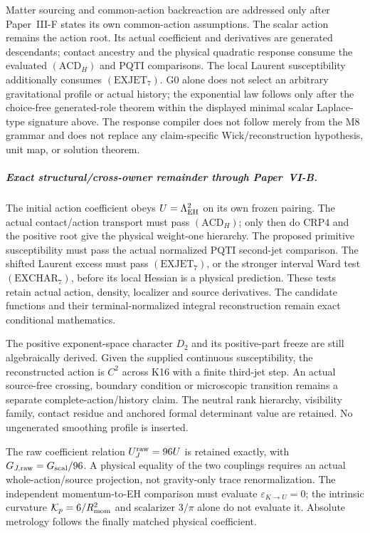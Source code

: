 \documentclass[12pt,a4paper]{article}
\begin{document}
Matter sourcing and common-action backreaction are addressed only after
Paper~III-F states its own common-action assumptions.
The scalar action remains the action root. Its actual coefficient and
derivatives are generated descendants; contact ancestry and the physical
quadratic response consume the evaluated $(\mathrm{ACD}_H)$ and PQTI
comparisons. The local Laurent susceptibility additionally consumes
$(\mathrm{EXJET}_7)$.  G0 alone
does not select an arbitrary gravitational profile or actual history; the
exponential law follows only after the
choice-free generated-role theorem within the displayed minimal scalar
Laplace-type signature above.  The response compiler does not follow merely
from the M8 grammar and does not replace any claim-specific
Wick/reconstruction hypothesis, unit map, or solution theorem.


\subparagraph{Exact structural/cross-owner remainder through Paper~VI-B.}
The initial action coefficient obeys $U=\Lambda_{\rm EH}^2$ on its own
frozen pairing. The actual contact/action transport must pass
$(\mathrm{ACD}_H)$; only then do CRP4 and the positive root give the
physical weight-one hierarchy. The proposed primitive susceptibility must
pass the actual normalized PQTI second-jet comparison. The shifted Laurent
excess must pass $(\mathrm{EXJET}_7)$, or the stronger interval Ward test
$(\mathrm{EXCHAR}_7)$, before its local Hessian is a physical prediction.
These tests retain actual action, density, localizer and source derivatives.
The candidate functions and their terminal-normalized integral reconstruction
remain exact conditional mathematics.


The positive exponent-space character $D_2$ and its positive-part freeze are
still algebraically derived. Given the supplied continuous susceptibility,
the reconstructed action is $C^2$ across K16 with a finite third-jet step.
An actual source-free crossing, boundary condition or microscopic transition
remains a separate complete-action/history claim. The neutral rank hierarchy,
visibility family, contact residue and anchored formal determinant value are
retained. No ungenerated smoothing profile is inserted.

The raw coefficient relation $U_J^{\rm raw}=96U$ is retained exactly, with
$G_{J,\rm raw}=G_{\rm scal}/96$. A physical equality of the two couplings
requires an actual whole-action/source projection, not gravity-only trace
renormalization. The independent momentum-to-EH comparison must evaluate
$\varepsilon_{K\to U}=0$; the intrinsic curvature
$\mathcal K_p=6/R_{\mathrm{mom}}^2$ and scalarizer $3/\pi$ alone do not evaluate it.
Absolute metrology follows the finally matched physical coefficient.


\printbibliography
\end{document}

